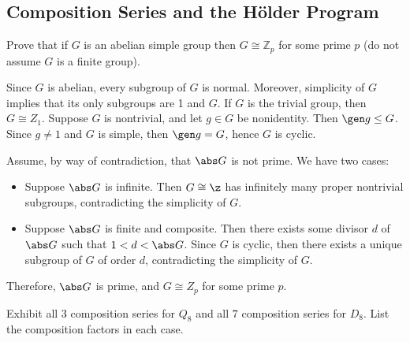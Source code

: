 \newpage

\subsection{Composition Series and the H\"older Program}

\begin{exercise}\label{ex3.4.1}
    Prove that if $G$ is an abelian simple group then $G \cong \mathbb{Z}_p$ for some prime $p$ (do not assume $G$ is a finite group).
\end{exercise}

\begin{sol}
    Since $G$ is abelian, every subgroup of $G$ is normal. Moreover, simplicity of $G$ implies that its only subgroups are 1 and $G$. If $G$ is the trivial group, then $G \cong Z_1$. Suppose $G$ is nontrivial, and let $g \in G$ be nonidentity. Then $\gen g \leq G$. Since $g \neq 1$ and $G$ is simple, then $\gen g = G$, hence $G$ is cyclic.

    Assume, by way of contradiction, that $\abs G$ is not prime. We have two cases:
    \begin{itemize}
        \item Suppose $\abs G$ is infinite. Then $G \cong \z$ has infinitely many proper nontrivial subgroups, contradicting the simplicity of $G$.
        \item Suppose $\abs G$ is finite and composite. Then there exists some divisor $d$ of $\abs G$ such that $1 < d < \abs G$. Since $G$ is cyclic, then there exists a unique subgroup of $G$ of order $d$, contradicting the simplicity of $G$.
    \end{itemize}
    Therefore, $\abs G$ is prime, and $G \cong Z_p$ for some prime $p$.
\end{sol}

\begin{exercise}\label{ex3.4.2}
    Exhibit all $3$ composition series for $Q_8$ and all $7$ composition series for $D_8$. List the composition factors in each case.
\end{exercise}

